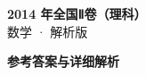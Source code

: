 \documentclass[zihao=-4, a4paper]{ctexart}
\begin{document}
\begin{center}
  {\Large\bfseries 2014 年全国Ⅱ卷（理科）}\\[4pt]
  {\large 数学 · 解析版}
\end{center}
\medskip
{}

\clearpage
{}
\begin{center}{\Large\bfseries 参考答案与详细解析}\end{center}
\medskip

\end{document}
